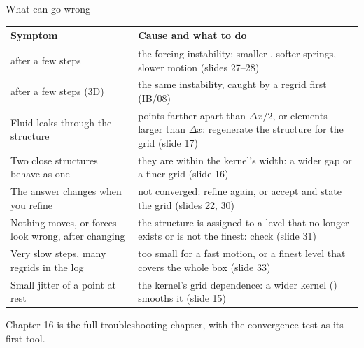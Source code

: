 \documentclass[aspectratio=169,11pt]{beamer}
\begin{document}
\begin{frame}{What can go wrong}
\scriptsize
\begin{tabular}{@{}L{0.3\textwidth}L{0.64\textwidth}@{}}
\toprule
Symptom & Cause and what to do\\
\midrule
{} after a few steps & the forcing instability: smaller , softer springs, slower motion (slides 27--28)\\
 after a few steps (3D) & the same instability, caught by a regrid first (IB/08)\\
Fluid leaks through the structure & points farther apart than $\Delta x/2$, or elements larger than $\Delta x$: regenerate the structure for the grid (slide 17)\\
Two close structures behave as one & they are within the kernel's width: a wider gap or a finer grid (slide 16)\\
The answer changes when you refine & not converged: refine again, or accept and state the grid (slides 22, 30)\\
Nothing moves, or forces look wrong, after changing  & the structure is assigned to a level that no longer exists or is not the finest: check  (slide 31)\\
Very slow steps, many regrids in the log &  too small for a fast motion, or a finest level that covers the whole box (slide 33)\\
Small jitter of a point at rest & the kernel's grid dependence: a wider kernel () smooths it (slide 15)\\
\bottomrule
\end{tabular}
\vspace{1mm}
\small Chapter 16 is the full troubleshooting chapter, with the convergence test as its first tool.
\end{frame}
\end{document}
